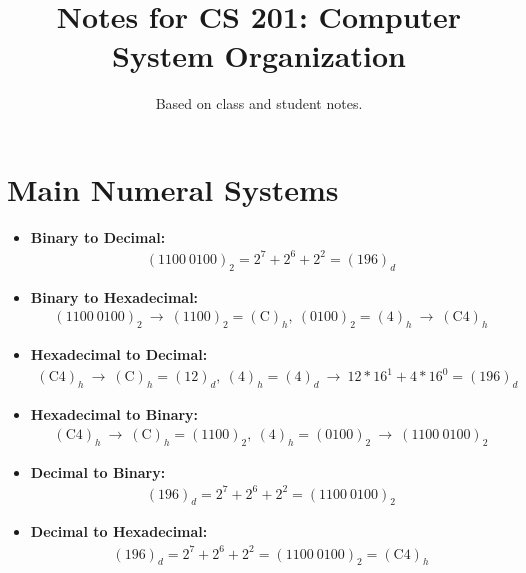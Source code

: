 \documentclass{article}
\title{Notes for CS 201: Computer System Organization}
\author{Based on class and student notes.}
\begin{document}
\maketitle
\tableofcontents
\newpage


\section{Main Numeral Systems}
\begin{itemize}
    \item \textbf{Binary to Decimal: }
    \begin{align*}
        (1100~0100)_2 = 2^7+2^6+2^2 = (196)_d
    \end{align*}
    \item \textbf{Binary to Hexadecimal: }
    \begin{align*}
        (1100~0100)_2 ~\rightarrow~ (1100)_2=(\text{C})_h,~(0100)_2=(4)_h~\rightarrow ~(\text{C4})_h
    \end{align*}
    \item \textbf{Hexadecimal to Decimal: }
    \begin{align*}
         (\text{C4})_h~\rightarrow ~
        (\text{C})_h = (12)_d,~(4)_h=(4)_d ~\rightarrow ~
        12*16^1+4*16^0=(196)_d
    \end{align*}
    \item \textbf{Hexadecimal to Binary: }
    \begin{align*}
        (\text{C4})_h~\rightarrow ~
        (\text{C})_h = (1100)_2,~(4)_h=(0100)_2 ~\rightarrow ~
        (1100~0100)_2
    \end{align*}
    \item \textbf{Decimal to Binary: }
    \begin{align*}
        (196)_d=2^7+2^6+2^2=(1100~0100)_2
    \end{align*}
    \item \textbf{Decimal to Hexadecimal: }
    \begin{align*}
        (196)_d=2^7+2^6+2^2=(1100~0100)_2=(\text{C4})_h
    \end{align*}
\end{itemize}
\end{document}
